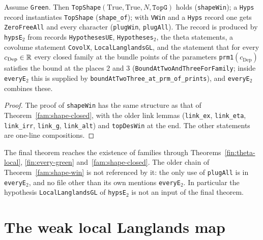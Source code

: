 \begin{theorem}\label{fam:shape-win}
Assume \texttt{Green}. Then \texttt{TopShape}$(\mathrm{True},\mathrm{True},N,\texttt{TopG})$ holds (\texttt{shapeWin}); a \texttt{Hyps} record instantiates \texttt{TopShape} (\texttt{shape\_of}); with \texttt{VWin} and a \texttt{Hyps} record one gets \texttt{ZeroFreeAll} and every character (\texttt{plugWin}, \texttt{plugAll}). The record is produced by \texttt{hypsE$_2$} from records \texttt{HypothesesUE}, \texttt{Hypotheses$_2$}, the theta statements, a covolume statement \texttt{CovolX}, \texttt{LocalLanglandsGL}, and the statement that for every $c_{\mathrm{Dep}}\in\mathbb{R}$ every closed family at the bundle points of the parameters \texttt{prm1}$(c_{\mathrm{Dep}})$ satisfies the bound at the places $2$ and $3$ (\texttt{BoundAtTwoAndThreeForFamily}; inside \texttt{everyE$_2$} this is supplied by \texttt{boundAtTwoThree\_at\_prm\_of\_prints}), and \texttt{everyE$_2$} combines these.
\end{theorem}
\begin{proof}
The proof of \texttt{shapeWin} has the same structure as that of Theorem~\ref{fam:shape-closed}, with the older link lemmas (\texttt{link\_ex}, \texttt{link\_eta}, \texttt{link\_irr}, \texttt{link\_g}, \texttt{link\_alt}) and \texttt{topDesWin} at the end. The other statements are one-line compositions.
\end{proof}

\begin{remark}\label{fam:rem-dead-copy}
The final theorem reaches the existence of families through Theorems~\ref{fin:theta-local}, \ref{fin:every-green} and~\ref{fam:shape-closed}. The older chain of Theorem~\ref{fam:shape-win} is not referenced by it: the only use of \texttt{plugAll} is in \texttt{everyE$_2$}, and no file other than its own mentions \texttt{everyE$_2$}. In particular the hypothesis \texttt{LocalLanglandsGL} of \texttt{hypsE$_2$} is not an input of the final theorem.
\end{remark}

\section{The weak local Langlands map}

